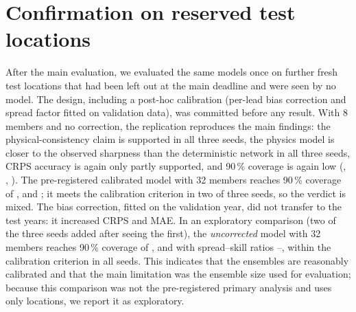 \documentclass[10pt]{article}
\begin{document}
\section{Confirmation on reserved test locations}\label{sec:confirm}
After the main evaluation, we evaluated the same models once on  further fresh test locations that
had been left out at the main deadline and were seen by no model. The design, including a post-hoc calibration
(per-lead bias correction and spread factor fitted on validation data), was committed before any result. With 8
members and no correction, the replication reproduces the main findings: the physical-consistency claim is
supported in all three seeds, the physics model is closer to the observed sharpness than the deterministic network in
all three seeds, CRPS accuracy is again only partly supported, and 90\,\% coverage is again low
(, , ). The pre-registered calibrated
model with 32 members reaches 90\,\% coverage of , 
and ; it meets the calibration criterion in two of three seeds, so the verdict is
mixed. The bias correction, fitted on the validation year, did not transfer to the test years: it increased CRPS and
MAE. In an exploratory comparison (two of the three seeds added after seeing the first), the \emph{uncorrected}
model with 32 members reaches 90\,\% coverage of ,  and
 with spread--skill ratios --,
within the calibration criterion in all seeds. This indicates that the ensembles are reasonably calibrated and that
the main limitation was the ensemble size used for evaluation; because this comparison was not the pre-registered
primary analysis and uses only  locations, we report it as exploratory.
\end{document}
